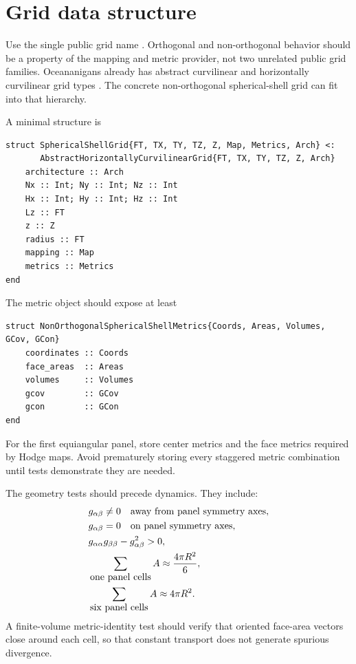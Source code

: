 \documentclass[11pt]{article}
\newcommand{\code}[1]{\texttt{\detokenize{#1}}}
\begin{document}
\section{Grid data structure}
\label{sec:grid-data}

Use the single public grid name \code{SphericalShellGrid}.  Orthogonal and non-orthogonal behavior should be a property of the mapping and metric provider, not two unrelated public grid families.  Oceananigans already has abstract curvilinear and horizontally curvilinear grid types \citep{OceananigansGrids,OceananigansAbstractGrid}.  The concrete non-orthogonal spherical-shell grid can fit into that hierarchy.

A minimal structure is
\begin{lstlisting}
struct SphericalShellGrid{FT, TX, TY, TZ, Z, Map, Metrics, Arch} <:
       AbstractHorizontallyCurvilinearGrid{FT, TX, TY, TZ, Z, Arch}
    architecture :: Arch
    Nx :: Int; Ny :: Int; Nz :: Int
    Hx :: Int; Hy :: Int; Hz :: Int
    Lz :: FT
    z :: Z
    radius :: FT
    mapping :: Map
    metrics :: Metrics
end
\end{lstlisting}
The metric object should expose at least
\begin{lstlisting}
struct NonOrthogonalSphericalShellMetrics{Coords, Areas, Volumes, GCov, GCon}
    coordinates :: Coords
    face_areas  :: Areas
    volumes     :: Volumes
    gcov        :: GCov
    gcon        :: GCon
end
\end{lstlisting}
For the first equiangular panel, store center metrics and the face metrics required by Hodge maps.  Avoid prematurely storing every staggered metric combination until tests demonstrate they are needed.

The geometry tests should precede dynamics.  They include:
\begin{align}
  &g_{\alpha\beta}\ne 0 \quad \hbox{away from panel symmetry axes}, \\
  &g_{\alpha\beta}=0 \quad \hbox{on panel symmetry axes}, \\
  &g_{\alpha\alpha}g_{\beta\beta}-g_{\alpha\beta}^2 > 0, \\
  &\sum_{\hbox{one panel cells}} A \approx \frac{4\pi R^2}{6}, \\
  &\sum_{\hbox{six panel cells}} A \approx 4\pi R^2.
\end{align}
A finite-volume metric-identity test should verify that oriented face-area vectors close around each cell, so that constant transport does not generate spurious divergence.
\end{document}
